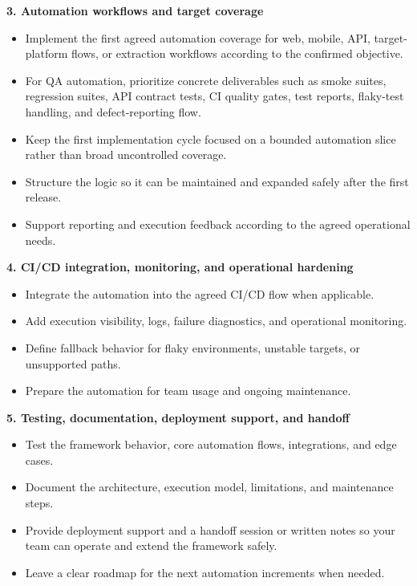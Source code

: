\documentclass[11pt,a4paper]{article}
\begin{document}
\textbf{3. Automation workflows and target coverage}\par

\begin{itemize}
\item Implement the first agreed automation coverage for web, mobile, API, target-platform flows, or extraction workflows according to the confirmed objective.
\item For QA automation, prioritize concrete deliverables such as smoke suites, regression suites, API contract tests, CI quality gates, test reports, flaky-test handling, and defect-reporting flow.
\item Keep the first implementation cycle focused on a bounded automation slice rather than broad uncontrolled coverage.
\item Structure the logic so it can be maintained and expanded safely after the first release.
\item Support reporting and execution feedback according to the agreed operational needs.
\end{itemize}

\textbf{4. CI/CD integration, monitoring, and operational hardening}\par

\begin{itemize}
\item Integrate the automation into the agreed CI/CD flow when applicable.
\item Add execution visibility, logs, failure diagnostics, and operational monitoring.
\item Define fallback behavior for flaky environments, unstable targets, or unsupported paths.
\item Prepare the automation for team usage and ongoing maintenance.
\end{itemize}

\textbf{5. Testing, documentation, deployment support, and handoff}\par

\begin{itemize}
\item Test the framework behavior, core automation flows, integrations, and edge cases.
\item Document the architecture, execution model, limitations, and maintenance steps.
\item Provide deployment support and a handoff session or written notes so your team can operate and extend the framework safely.
\item Leave a clear roadmap for the next automation increments when needed.
\end{itemize}
\end{document}
